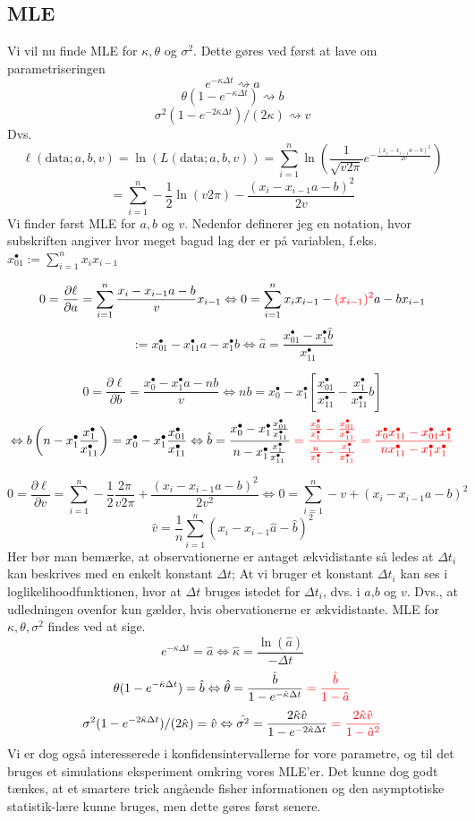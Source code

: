 \documentclass{article}
\theoremstyle{definition}
\theoremstyle{remark}
\newcommand\ens{\Leftrightarrow}
\begin{document}
\subsection{MLE}
Vi vil nu finde MLE for $\kappa, \theta$ og $\sigma^2$. Dette gøres ved først at lave om parametriseringen 
$$ e^{-\kappa\Delta t}\rightsquigarrow a$$
$$\theta(1-e^{-\kappa\Delta t})\rightsquigarrow b$$
$$\sigma^2(1-e^{-2\kappa\Delta t})/(2\kappa) \rightsquigarrow v$$
Dvs.
$$\ell(\text{data};a,b,v)=\ln(L(\text{data};a,b,v))=\sum_{i=1}^n \ln\left(\frac1{\sqrt{v2\pi}}e^{-\frac{(x_i-x_{i-1}a-b)^2}{2v}}\right)$$
$$=\sum_{i=1}^n-\frac12\ln(v2\pi)-\frac{(x_i-x_{i-1}a-b)^2}{2v}$$
Vi finder først MLE for $a,b$ og $v$. Nedenfor definerer jeg en notation, hvor subskriften angiver hvor meget bagud lag der er på variablen, f.eks. $x_{01}^\bullet:=\sum_{i=1}^nx_ix_{i-1}$

$$ 0=\frac{\partial \ell}{\partial a}=\sum_{i=1}^n\frac{x_i-x_{i-1}a-b}{v}x_{i-1}\ens0=\sum_{i=1}^n x_ix_{i-1}-\color{red}(x_{i-1})^2\color{black}a-bx_{i-1}$$
$$:=x^\bullet_{01}-x^\bullet_{11}a-x^\bullet_1b\ens \hat a=\frac{x_{01}^\bullet-x^\bullet_1\hat b}{x^\bullet_{11}}$$

$$0=\frac{\partial \ell}{\partial b}=\frac{x^\bullet_0-x_1^\bullet a-nb}{v}\ens nb = x_0^\bullet-x_1^\bullet\left[ \frac{x_{01}^\bullet}{x_{11}^\bullet}-\frac{x_1^\bullet}{x_{11}^\bullet}b \right]$$
$$\ens b\left(n-x_1^\bullet\frac{x_1^\bullet}{x_{11}^\bullet}\right)=x_0^\bullet-x_1^\bullet\frac{x_{01}^\bullet}{x_{11}^\bullet}\ens \hat b = \frac{x_0^\bullet-x_1^\bullet\frac{x_{01}^\bullet}{x_{11}^\bullet}}{n-x_1^\bullet\frac{x_1^\bullet}{x_{11}^\bullet}}\color{red}=\frac{\frac{x_0^\bullet}{x_1^\bullet}-\frac{x_{01}^\bullet}{x_{11}^\bullet}}{\frac{n}{x_1^\bullet}-\frac{x_{1}^\bullet}{x_{11}^\bullet}}=\frac{x_0^\bullet x_{11}^\bullet-x_{01}^\bullet x_1^\bullet}{n x_{11}^\bullet- x_1^{\bullet}x_1^{\bullet}}\color{black}$$

$$0=\frac{\partial \ell}{\partial v}=\sum_{i=1}^n -\frac12\frac{2\pi}{v2\pi}+\frac{(x_i-x_{i-1}a-b)^2}{2v^2}\ens 0=\sum_{i=1}^n -v+(x_i-x_{i-1}a-b)^2$$
$$\hat v = \frac1n\sum_{i=1}^n(x_i-x_{i-1}\hat a-\hat b)^2$$
Her bør man bemærke, at observationerne er antaget ækvidistante så ledes at $\Delta t_i$ kan beskrives med en enkelt konstant $\Delta t$\color{red}; At vi bruger et konstant $\Delta t_i$ kan ses i loglikelihoodfunktionen, hvor at $\Delta t$ bruges istedet for $\Delta t_i$, dvs. i $a$,$b$ og $v$\color{black}. Dvs., at udledningen ovenfor kun gælder, hvis obervationerne er ækvidistante. 
MLE for $\kappa,\theta,\sigma^2$ findes ved at sige.
$$e^{-\kappa\Delta t}=\hat a\ens \hat \kappa=\frac{\ln(\hat a)}{-\Delta t}$$
$$\theta(1-e^{-\hat \kappa \Delta t})=\hat b\ens \hat \theta =\frac{\hat b}{1-e^{-\hat \kappa\Delta t}}\color{red}=\frac{\hat b}{1-\hat a}\color{black}$$
$$\sigma^2(1-e^{-2\hat\kappa\Delta t})/(2\hat\kappa)=\hat v \ens \hat{\sigma^2}=\frac{2\hat\kappa\hat v}{1-e^{-2\hat\kappa\Delta t}}\color{red}=\frac{2\hat\kappa\hat v}{1-{\hat a}^2}\color{black}$$
Vi er dog også interesserede i  konfidensintervallerne for vore parametre, og til det bruges et simulations eksperiment omkring vores MLE'er. Det kunne dog godt tænkes, at et smartere trick angående fisher informationen og den asymptotiske statistik-lære kunne bruges, men dette gøres først senere.
\end{document}
